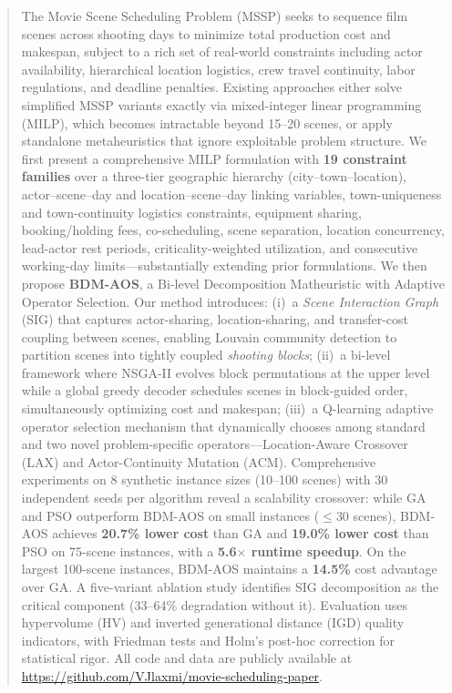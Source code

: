 \begin{abstract}
The Movie Scene Scheduling Problem (MSSP) seeks to sequence film scenes across shooting days to minimize total production cost and makespan, subject to a rich set of real-world constraints including actor availability, hierarchical location logistics, crew travel continuity, labor regulations, and deadline penalties.
Existing approaches either solve simplified MSSP variants exactly via mixed-integer linear programming (MILP), which becomes intractable beyond 15--20 scenes, or apply standalone metaheuristics that ignore exploitable problem structure.
We first present a comprehensive MILP formulation with \textbf{19 constraint families} over a three-tier geographic hierarchy (city--town--location), actor--scene--day and location--scene--day linking variables, town-uniqueness and town-continuity logistics constraints, equipment sharing, booking/holding fees, co-scheduling, scene separation, location concurrency, lead-actor rest periods, criticality-weighted utilization, and consecutive working-day limits---substantially extending prior formulations.
We then propose \textbf{BDM-AOS}, a Bi-level Decomposition Matheuristic with Adaptive Operator Selection.
Our method introduces:
(i)~a \emph{Scene Interaction Graph} (SIG) that captures actor-sharing, location-sharing, and transfer-cost coupling between scenes, enabling Louvain community detection to partition scenes into tightly coupled \emph{shooting blocks};
(ii)~a bi-level framework where NSGA-II evolves block permutations at the upper level while a global greedy decoder schedules scenes in block-guided order, simultaneously optimizing cost and makespan;
(iii)~a Q-learning adaptive operator selection mechanism that dynamically chooses among standard and two novel problem-specific operators---Location-Aware Crossover (LAX) and Actor-Continuity Mutation (ACM).
Comprehensive experiments on 8 synthetic instance sizes (10--100 scenes) with 30 independent seeds per algorithm reveal a scalability crossover: while GA and PSO outperform BDM-AOS on small instances ($\leq 30$ scenes), BDM-AOS achieves \textbf{20.7\% lower cost} than GA and \textbf{19.0\% lower cost} than PSO on 75-scene instances, with a \textbf{5.6$\times$ runtime speedup}.
On the largest 100-scene instances, BDM-AOS maintains a \textbf{14.5\%} cost advantage over GA.
A five-variant ablation study identifies SIG decomposition as the critical component (33--64\% degradation without it).
Evaluation uses hypervolume (HV) and inverted generational distance (IGD) quality indicators, with Friedman tests and Holm's post-hoc correction for statistical rigor.
All code and data are publicly available at \url{https://github.com/VJlaxmi/movie-scheduling-paper}.
\end{abstract}
